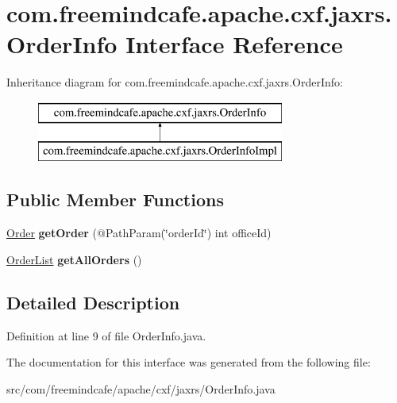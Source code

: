 \hypertarget{interfacecom_1_1freemindcafe_1_1apache_1_1cxf_1_1jaxrs_1_1_order_info}{}\section{com.\+freemindcafe.\+apache.\+cxf.\+jaxrs.\+Order\+Info Interface Reference}
\label{interfacecom_1_1freemindcafe_1_1apache_1_1cxf_1_1jaxrs_1_1_order_info}
Inheritance diagram for com.\+freemindcafe.\+apache.\+cxf.\+jaxrs.\+Order\+Info\+:\begin{figure}[H]
\begin{center}
\leavevmode
\includegraphics[height=2.000000cm]{interfacecom_1_1freemindcafe_1_1apache_1_1cxf_1_1jaxrs_1_1_order_info}
\end{center}
\end{figure}
\subsection*{Public Member Functions}
\begin{DoxyCompactItemize}
\item 
\hypertarget{interfacecom_1_1freemindcafe_1_1apache_1_1cxf_1_1jaxrs_1_1_order_info_a745e6ef89b802d027de64515d9a6156e}{}\hyperlink{classcom_1_1freemindcafe_1_1apache_1_1cxf_1_1jaxrs_1_1_order}{Order} {\bfseries get\+Order} (@Path\+Param(\char`\"{}order\+Id\char`\"{}) int office\+Id)\label{interfacecom_1_1freemindcafe_1_1apache_1_1cxf_1_1jaxrs_1_1_order_info_a745e6ef89b802d027de64515d9a6156e}

\item 
\hypertarget{interfacecom_1_1freemindcafe_1_1apache_1_1cxf_1_1jaxrs_1_1_order_info_a0fd7fd4cf98c9e5fb7c9dcf4ce645e89}{}\hyperlink{classcom_1_1freemindcafe_1_1apache_1_1cxf_1_1jaxrs_1_1_order_list}{Order\+List} {\bfseries get\+All\+Orders} ()\label{interfacecom_1_1freemindcafe_1_1apache_1_1cxf_1_1jaxrs_1_1_order_info_a0fd7fd4cf98c9e5fb7c9dcf4ce645e89}

\end{DoxyCompactItemize}


\subsection{Detailed Description}


Definition at line 9 of file Order\+Info.\+java.



The documentation for this interface was generated from the following file\+:\begin{DoxyCompactItemize}
\item 
src/com/freemindcafe/apache/cxf/jaxrs/Order\+Info.\+java\end{DoxyCompactItemize}

